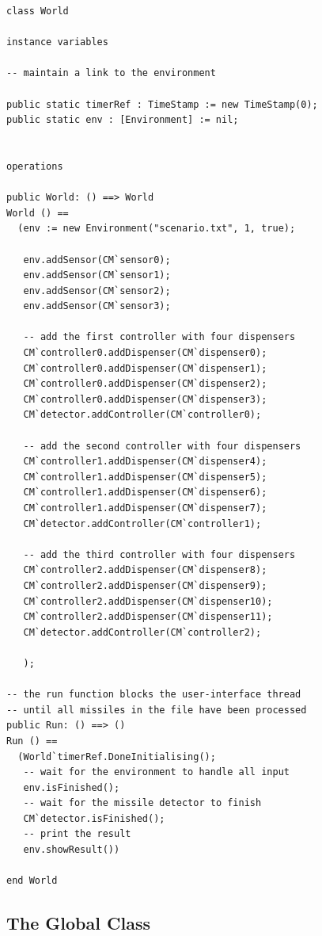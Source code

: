 \documentclass{overturerepchap}
\begin{document}
\begin{lstlisting}
class World

instance variables

-- maintain a link to the environment

public static timerRef : TimeStamp := new TimeStamp(0);
public static env : [Environment] := nil;


operations

public World: () ==> World
World () ==
  (env := new Environment("scenario.txt", 1, true);
   
   env.addSensor(CM`sensor0);
   env.addSensor(CM`sensor1);
   env.addSensor(CM`sensor2);
   env.addSensor(CM`sensor3);

   -- add the first controller with four dispensers
   CM`controller0.addDispenser(CM`dispenser0);
   CM`controller0.addDispenser(CM`dispenser1);
   CM`controller0.addDispenser(CM`dispenser2);
   CM`controller0.addDispenser(CM`dispenser3);
   CM`detector.addController(CM`controller0);

   -- add the second controller with four dispensers
   CM`controller1.addDispenser(CM`dispenser4);
   CM`controller1.addDispenser(CM`dispenser5);
   CM`controller1.addDispenser(CM`dispenser6);
   CM`controller1.addDispenser(CM`dispenser7);
   CM`detector.addController(CM`controller1);
 
   -- add the third controller with four dispensers
   CM`controller2.addDispenser(CM`dispenser8);
   CM`controller2.addDispenser(CM`dispenser9);
   CM`controller2.addDispenser(CM`dispenser10);
   CM`controller2.addDispenser(CM`dispenser11);
   CM`detector.addController(CM`controller2);
      
   );

-- the run function blocks the user-interface thread
-- until all missiles in the file have been processed
public Run: () ==> ()
Run () == 
  (World`timerRef.DoneInitialising();
   -- wait for the environment to handle all input
   env.isFinished();
   -- wait for the missile detector to finish
   CM`detector.isFinished();
   -- print the result
   env.showResult())

end World
\end{lstlisting}

\subsection{The Global Class}
\end{document}
